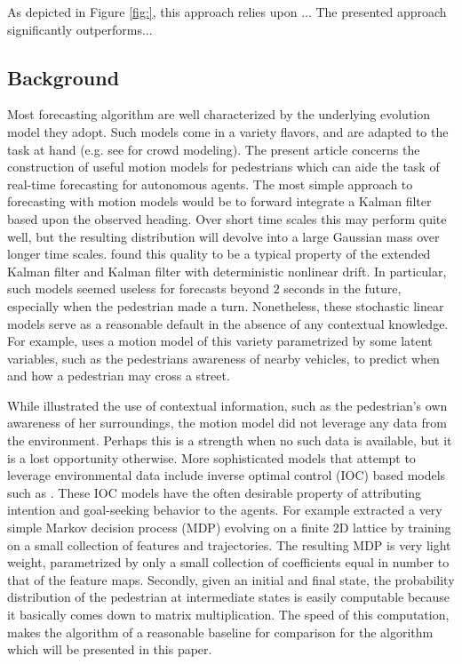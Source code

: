 \documentclass[conference]{IEEEtran}
\begin{document}
As depicted in Figure \ref{fig:}, this approach relies upon ... 
The presented approach significantly outperforms...


\subsection{Background}
Most forecasting algorithm are well characterized by the underlying evolution model they adopt.
Such models come in a variety flavors, and are adapted to the task at hand (e.g. see \cite{Helbing1992} for crowd modeling).
The present article concerns the construction of useful motion models for pedestrians which can aide the task of real-time forecasting for autonomous agents.
The most simple approach to forecasting with motion models would be to forward integrate a Kalman filter \cite{kalman1960new} based upon the observed heading.
Over short time scales this may perform quite well, but the resulting distribution will devolve into a large Gaussian mass over longer time scales.
\citet{Schneider2013} found this quality to be a typical property of the extended Kalman filter and Kalman filter with deterministic nonlinear drift.
In particular, such models seemed useless for forecasts beyond $2$ seconds in the future, especially when the pedestrian made a turn.
Nonetheless, these stochastic linear models serve as a reasonable default in the absence of any contextual knowledge.
For example, \citet{Kooji2014} uses a motion model of this variety parametrized by some latent variables, such as the pedestrians awareness of nearby vehicles, to predict when and how a pedestrian may cross a street.

While \cite{Kooji2014} illustrated the use of contextual information, such as the pedestrian's own awareness of her surroundings, the motion model did not leverage any data from the environment.
Perhaps this is a strength when no such data is available, but it is a lost opportunity otherwise.
More sophisticated models that attempt to leverage environmental data include inverse optimal control (IOC) based models such as \cite{Ziebart2008,Ziebart2009,Kitani2012,Karasev2016}.
These IOC models have the often desirable property of attributing intention and goal-seeking behavior to the agents.
For example \citet{Kitani2012} extracted a very simple Markov decision process (MDP) evolving on a finite 2D lattice by training on a small collection of features and trajectories.
The resulting MDP is very light weight, parametrized by only a small collection of coefficients equal in number to that of the feature maps.
Secondly, given an initial and final state, the probability distribution of the pedestrian at intermediate states is easily computable because it basically comes down to matrix multiplication.
The speed of this computation, makes the algorithm of \cite{Kitani2012} a reasonable baseline for comparison for the algorithm which will be presented in this paper.
\end{document}
